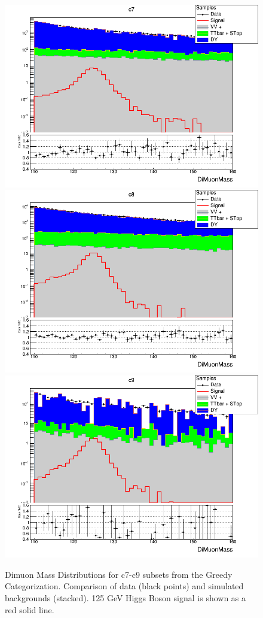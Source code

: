 \begin{figure}[htbp]
  \centering
  \includegraphics[width=0.65\linewidth]{figures/ch_higgs/distributions/bdt_uf/distribution__c7__DiMuonMass__logY.png}\\
  \includegraphics[width=0.65\linewidth]{figures/ch_higgs/distributions/bdt_uf/distribution__c8__DiMuonMass__logY.png}\\
  \includegraphics[width=0.65\linewidth]{figures/ch_higgs/distributions/bdt_uf/distribution__c9__DiMuonMass__logY.png}
  \caption{Dimuon Mass Distributions for c7-c9 subsets from the Greedy Categorization. Comparison of data (black points) and simulated backgrounds (stacked). 125 GeV Higgs Boson signal is shown as a red solid line.}
  \label{fig:higgs_categorization_greedyc7c9}
\end{figure}
